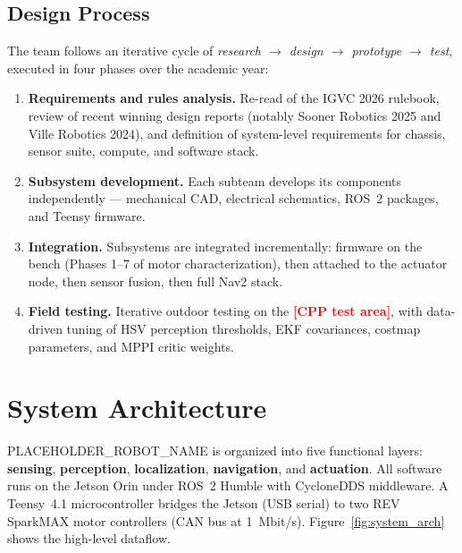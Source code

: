 \documentclass[11pt, letterpaper]{article}
\newcommand{\placeholder}[1]{\textcolor{red}{\textbf{[#1]}}}
\newcommand{\robotname}{PLACEHOLDER\_ROBOT\_NAME}
\begin{document}
\subsection{Design Process}

The team follows an iterative cycle of \textit{research $\rightarrow$ design
$\rightarrow$ prototype $\rightarrow$ test}, executed in four phases over the academic
year:

\begin{enumerate}
    \item \textbf{Requirements and rules analysis.} Re-read of the IGVC 2026 rulebook, review of recent winning design reports (notably Sooner Robotics 2025 and Ville Robotics 2024), and definition of system-level requirements for chassis, sensor suite, compute, and software stack.
    \item \textbf{Subsystem development.} Each subteam develops its components independently --- mechanical CAD, electrical schematics, ROS~2 packages, and Teensy firmware.
    \item \textbf{Integration.} Subsystems are integrated incrementally: firmware on the bench (Phases 1--7 of motor characterization), then attached to the actuator node, then sensor fusion, then full Nav2 stack.
    \item \textbf{Field testing.} Iterative outdoor testing on the \placeholder{CPP test area}, with data-driven tuning of HSV perception thresholds, EKF covariances, costmap parameters, and MPPI critic weights.
\end{enumerate}

\section{System Architecture}

\robotname{} is organized into five functional layers: \textbf{sensing}, \textbf{perception},
\textbf{localization}, \textbf{navigation}, and \textbf{actuation}. All software runs on the
Jetson Orin under ROS~2 Humble with CycloneDDS middleware. A Teensy~4.1 microcontroller bridges
the Jetson (USB serial) to two REV SparkMAX motor controllers (CAN bus at 1~Mbit/s).
Figure~\ref{fig:system_arch} shows the high-level dataflow.
\end{document}
